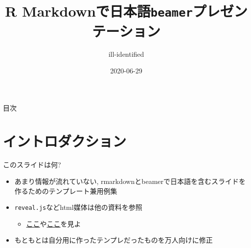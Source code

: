 \documentclass[
  12pt,
  ignorenonframetext,
]{beamer}
\title{R Markdownで日本語\texttt{beamer}プレゼンテーション}
\author{ill-identified}
\date{2020-06-29}
\providecommand{\tightlist}{%
  \setlength{\itemsep}{0pt}\setlength{\parskip}{0pt}}
\begin{document}
\frame{\titlepage}

\begin{frame}{目次}
\protect\hypertarget{ux76eeux6b21}{}

\tableofcontents[hideallsubsections]

\end{frame}

\hypertarget{ux30a4ux30f3ux30c8ux30edux30c0ux30afux30b7ux30e7ux30f3}{%
\section{イントロダクション}\label{ux30a4ux30f3ux30c8ux30edux30c0ux30afux30b7ux30e7ux30f3}}

\begin{frame}[fragile]{このスライドは何?}
\protect\hypertarget{ux3053ux306eux30b9ux30e9ux30a4ux30c9ux306fux4f55}{}

\begin{itemize}
\tightlist
\item
  あまり情報が流れていない,
  rmarkdownとbeamerで日本語を含むスライドを作るためのテンプレート兼用例集
\item
  \texttt{reveal.js}などhtml媒体は他の資料を参照

  \begin{itemize}
  \tightlist
  \item
    \href{https://kazutan.github.io/SappoRoR6/rmd_slide.html\#/}{ここ}や\href{https://kazutan.github.io/fukuokaR11/intro_rmarkdown_d.html}{ここ}を見よ
  \end{itemize}
\item
  もともとは自分用に作ったテンプレだったものを万人向けに修正
\end{itemize}

\end{frame}
\end{document}
